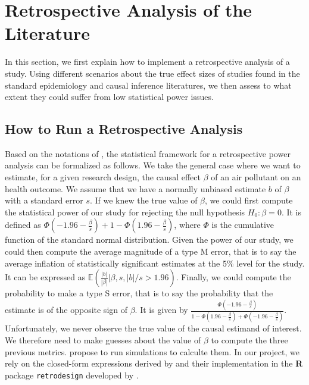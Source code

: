\documentclass[12pt]{article}
\begin{document}



\section{Retrospective Analysis of the Literature}
    
    In this section, we first explain how to implement a retrospective analysis of a study. Using different scenarios about the true effect sizes of studies found in the standard epidemiology and causal inference literatures, we then assess to what extent they could suffer from low statistical power issues.
    
    \subsection{How to Run a Retrospective Analysis}
    
    Based on the notations of \cite{zwet_significance_2021}, the statistical framework for a retrospective power analysis can be formalized as follows. We take the general case where we want to estimate, for a given research design, the causal effect $\beta$ of an air pollutant on an health outcome. We assume that we have a normally unbiased estimate $b$ of $\beta$ with a standard error $s$. If we knew the true value of $\beta$, we could first compute the statistical power of our study for rejecting the null hypothesis $H_{0}: \beta = 0$. It is defined as $\Phi(-1.96-\frac{\beta}{s})+1-\Phi(1.96-\frac{\beta}{s})$, where $\Phi$ is the cumulative function of the standard normal distribution. Given the power of our study, we could then compute the average magnitude of a type M error, that is to say the average inflation of statistically significant estimates at the 5\% level for the study. It can be expressed as $\mathbb{E}(\frac{|b|}{|\beta|} | \beta, s, |b|/s>1.96)$. Finally, we could compute the probability to make a type S error, that is to say the probability that the estimate is of the opposite sign of $\beta$. It is given by $\frac{\Phi(-1.96-\frac{\beta}{s})}{1-\Phi(1.96-\frac{\beta}{s}) + \Phi(-1.96 - \frac{\beta}{s})}$. Unfortunately, we never observe the true value of the causal estimand of interest. We therefore need to make guesses about the value of $\beta$ to compute the three previous metrics. \cite{gelman_beyond_2014} propose to run simulations to calculte them. In our project, we rely on the closed-form expressions derived by \cite{lu_note_2019} and their implementation in the \textbf{\textsf{R}} package \texttt{retrodesign} developed by \cite{timm_retrodesign_2019}.
    
\end{document}
